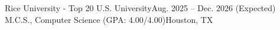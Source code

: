   \resumeEducation
    {Rice University - Top 20 U.S. University}{Aug. 2025 -- Dec. 2026 (Expected)}
    {M.C.S., Computer Science (GPA: 4.00/4.00)}{Houston, TX}%

